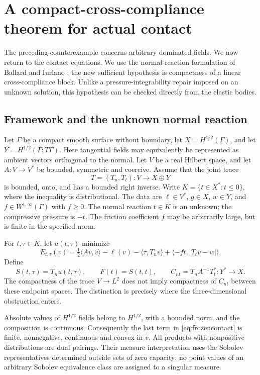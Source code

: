 \documentclass[11pt,a4paper]{article}
\theoremstyle{definition}\newtheorem{definition}[theorem]{Definition}
\theoremstyle{remark}\newtheorem{remark}[theorem]{Remark}
\newcommand{\ip}[2]{\langle #1,#2\rangle}
\numberwithin{equation}{section}
\begin{document}
\section{A compact-cross-compliance theorem for actual contact}\label{sec:actual}
The preceding counterexample concerns arbitrary dominated fields. We now return to the contact equations. We use the normal-reaction formulation of Ballard and Iurlano \cite{BI}; the new sufficient hypothesis is compactness of a linear cross-compliance block. Unlike a pressure-integrability repair imposed on an unknown solution, this hypothesis can be checked directly from the elastic bodies.

\subsection{Framework and the unknown normal reaction}
Let $\Gamma$ be a compact smooth surface without boundary, let $X=H^{1/2}(\Gamma)$, and let $Y=H^{1/2}(\Gamma;T\Gamma)$. Here tangential fields may equivalently be represented as ambient vectors orthogonal to the normal. Let $V$ be a real Hilbert space, and let $A:V\to V^*$ be bounded, symmetric and coercive. Assume that the joint trace
\[
 T=(T_n,T_t):V\longrightarrow X\oplus Y
\]
is bounded, onto, and has a bounded right inverse. Write $K=\{t\in X^*:t\le0\}$, where the inequality is distributional. The data are $\ell\in V^*$, $g\in X$, $w\in Y$, and $f\in W^{1,\infty}(\Gamma)$ with $f\ge0$. The normal reaction $t\in K$ is an unknown; the compressive pressure is $-t$. The friction coefficient $f$ may be arbitrarily large, but is finite in the specified norm.

For $t,\tau\in K$, let $u(t,\tau)$ minimize
\begin{equation}\label{eq:frozencontact}
 E_{t,\tau}(v)=\tfrac12\ip{Av}{v}-\ell(v)-\ip{\tau}{T_nv}
                 +\ip{-ft}{|T_tv-w|}.
\end{equation}
Define
\begin{equation}\label{eq:normalmap}
 S(t,\tau)=T_nu(t,\tau),\qquad F(t)=S(t,t),\qquad
 C_{nt}=T_nA^{-1}T_t^*:Y^*\longrightarrow X.
\end{equation}
The compactness of the trace $V\to L^2$ does not imply compactness of $C_{nt}$ between these endpoint spaces. The distinction is precisely where the three-dimensional obstruction enters.

Absolute values of $H^{1/2}$ fields belong to $H^{1/2}$, with a bounded norm, and the composition is continuous. Consequently the last term in \eqref{eq:frozencontact} is finite, nonnegative, continuous and convex in $v$. All products with nonpositive distributions are dual pairings. Their measure interpretation uses the Sobolev representatives determined outside sets of zero capacity; no point values of an arbitrary Sobolev equivalence class are assigned to a singular measure.
\end{document}
